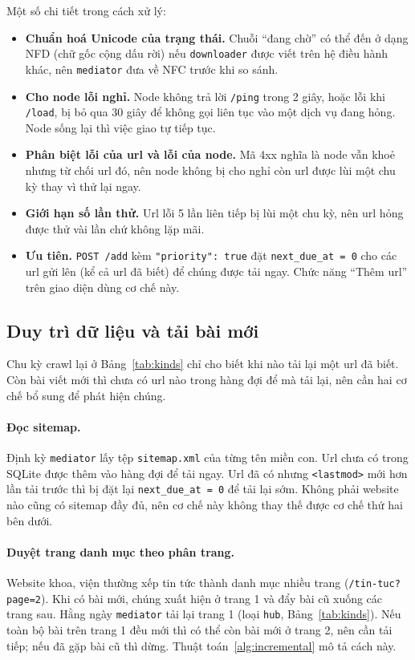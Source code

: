 \documentclass[12pt,a4paper]{report}
\begin{document}
Một số chi tiết trong cách xử lý:

\begin{itemize}
  \item \textbf{Chuẩn hoá Unicode của trạng thái.} Chuỗi ``đang chờ'' có thể đến ở dạng NFD (chữ gốc cộng dấu rời) nếu
        \texttt{downloader} được viết trên hệ điều hành khác, nên \texttt{mediator} đưa về NFC trước khi so sánh.
  \item \textbf{Cho node lỗi nghỉ.} Node không trả lời \texttt{/ping} trong 2 giây, hoặc lỗi khi \texttt{/load}, bị
        bỏ qua 30 giây để không gọi liên tục vào một dịch vụ đang hỏng. Node sống lại thì việc giao tự tiếp tục.
  \item \textbf{Phân biệt lỗi của url và lỗi của node.} Mã 4xx nghĩa là node vẫn khoẻ nhưng từ chối url đó, nên node
        không bị cho nghỉ còn url được lùi một chu kỳ thay vì thử lại ngay.
  \item \textbf{Giới hạn số lần thử.} Url lỗi 5 lần liên tiếp bị lùi một chu kỳ, nên url hỏng được thử vài lần chứ
        không lặp mãi.
  \item \textbf{Ưu tiên.} \texttt{POST /add} kèm \texttt{"priority": true} đặt \texttt{next\_\allowbreak{}due\_\allowbreak{}at = 0} cho các url
        gửi lên (kể cả url đã biết) để chúng được tải ngay. Chức năng ``Thêm url'' trên giao diện dùng cơ chế này.
\end{itemize}

\subsection{Duy trì dữ liệu và tải bài mới}\label{sec:incremental}

Chu kỳ crawl lại ở Bảng~\ref{tab:kinds} chỉ cho biết khi nào tải lại một url đã biết. Còn bài viết mới thì chưa có url
nào trong hàng đợi để mà tải lại, nên cần hai cơ chế bổ sung để phát hiện chúng.

\paragraph{Đọc sitemap.} Định kỳ \texttt{mediator} lấy tệp \texttt{sitemap.xml} của từng tên miền con. Url chưa có
trong SQLite được thêm vào hàng đợi để tải ngay. Url đã có nhưng \texttt{<lastmod>} mới hơn lần tải trước thì bị đặt lại
\texttt{next\_due\_at = 0} để tải lại sớm. Không phải website nào cũng có sitemap đầy đủ, nên cơ chế này không thay thế
được cơ chế thứ hai bên dưới.

\paragraph{Duyệt trang danh mục theo phân trang.} Website khoa, viện thường xếp tin tức thành danh mục nhiều trang
(\texttt{/tin-tuc?page=2}). Khi có bài mới, chúng xuất hiện ở trang 1 và đẩy bài cũ xuống các trang sau. Hằng ngày
\texttt{mediator} tải lại trang 1 (loại \texttt{hub}, Bảng~\ref{tab:kinds}). Nếu toàn bộ bài trên trang 1 đều mới thì có
thể còn bài mới ở trang 2, nên cần tải tiếp; nếu đã gặp bài cũ thì dừng. Thuật toán~\ref{alg:incremental} mô tả cách này.
\end{document}
